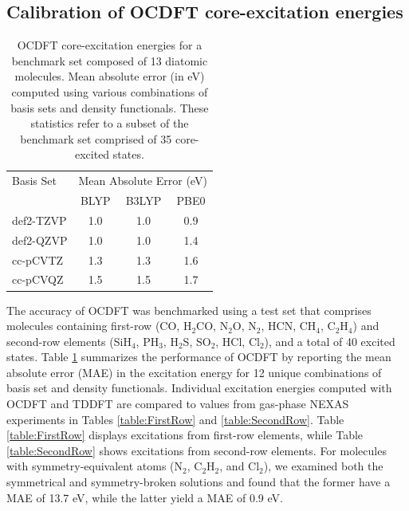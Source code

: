 \documentclass{article}
\begin{document}
\subsection{Calibration of OCDFT core-excitation energies}
\begin{table}[!b]
\small
\caption{OCDFT core-excitation energies for a benchmark set composed of 13 diatomic molecules.  Mean absolute error (in eV) computed using various combinations of basis sets and density functionals. These statistics refer to a subset of the benchmark set comprised of 35 core-excited states.}
\centering
    \begin{tabular}{lccc}
    \hline
    \hline
Basis Set & \multicolumn{3}{c}{Mean Absolute Error (eV)}  \\
& BLYP & B3LYP & PBE0\\
\hline
def2-TZVP & 1.0 & 1.0 & 0.9 \\
def2-QZVP & 1.0 & 1.0 & 1.4 \\
cc-pCVTZ & 1.3 & 1.3 & 1.6 \\
cc-pCVQZ & 1.5 & 1.5 & 1.7 \\
\hline
\hline
\end{tabular}
\label{table:OverallPerformance}
\end{table}
The accuracy of OCDFT was benchmarked using a test set that comprises molecules containing first-row (CO, H$_2$CO, N$_2$O, N$_2$, HCN, CH$_4$, C$_2$H$_4$) and second-row elements (SiH$_4$, PH$_3$, H$_2$S, SO$_2$, HCl, Cl$_2$), and a total of 40 excited states. 
Table \ref{table:OverallPerformance} summarizes the performance of OCDFT by reporting the mean absolute error (MAE) in the excitation energy for 12 unique combinations of basis set and density functionals.
Individual excitation energies computed with OCDFT and TDDFT are compared to values from gas-phase NEXAS experiments \cite{puttner_vibrationally_1999,remmers_high-resolution_1992,chen_k-shell_1989,tronc_nitrogen_1980,tronc_carbon_1979,francis_studies_1994,adachi_vibronic_1999,hitchcock_k-shell_1979,domke_carbon_1990,nayandin_angle-resolved_2001,bodeur_single-and_1990,gedat_s_1998,hudson_high-resolution_1994,cavell_chemical_1999,bodeur_photoabsorption_1985} in Tables \ref{table:FirstRow} and \ref{table:SecondRow}. Table \ref{table:FirstRow} displays excitations from first-row elements, while Table \ref{table:SecondRow} shows excitations from second-row elements. For molecules with symmetry-equivalent atoms (N$_2$, C$_2$H$_2$, and Cl$_2$), we examined both the symmetrical and symmetry-broken solutions and found that the former have a MAE of 13.7 eV, while the latter yield a MAE of 0.9 eV.
\end{document}
